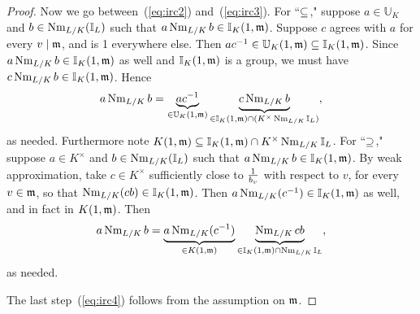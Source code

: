 \begin{proof}
Now we go between~(\ref{eq:irc2}) and~(\ref{eq:irc3}). For ``$\subseteq$," suppose $a\in \mathbb U_K$ and $b\in \operatorname{Nm}_{L/K}(\mathbb{I}_L)$ such that $a\operatorname{Nm}_{L/K}b\in\mathbb{I}_K(1,{\mathfrak{m}})$. Suppose $c$ agrees with $a$ for every $v\mid\mathfrak{m}$, and is 1 everywhere else. Then $ac^{-1}\in \mathbb U_{K}(1,\mathfrak{m})\subseteq \mathbb{I}_K(1,{\mathfrak{m}})$. Since $a\operatorname{Nm}_{L/K}b\in\mathbb{I}_K(1,{\mathfrak{m}})$ as well and $\mathbb{I}_K(1,{\mathfrak{m}})$ is a group, we must have $c\operatorname{Nm}_{L/K}b\in\mathbb{I}_K(1,{\mathfrak{m}})$.
Hence
\[
a\operatorname{Nm}_{L/K}b=\underbrace{ac^{-1}}_{\in \mathbb U_K(1,\mathfrak{m})} 
\underbrace{c\operatorname{Nm}_{L/K}b}_{\in \mathbb I_{K}(1,\mathfrak{m})\cap (K^{\times}\operatorname{Nm}_{L/K}\mathbb{I}_L)},
\]
as needed. Furthermore note $K(1,\mathfrak{m})\subseteq \mathbb{I}_K(1,\mathfrak{m})\cap K^{\times}\operatorname{Nm}_{L/K}\mathbb{I}_L$. For ``$\supseteq$," suppose $a\in K^{\times}$ and $b\in \operatorname{Nm}_{L/K}(\mathbb{I}_L)$ such that $a\operatorname{Nm}_{L/K}b\in\mathbb{I}_K(1,{\mathfrak{m}})$. %
By weak approximation, take $c\in K^{\times}$ sufficiently close to $\frac{1}{b_v}$ with respect to $v$, for every $v\in \mathfrak{m}$, so that $\operatorname{Nm}_{L/K}(cb)\in \mathbb{I}_K(1,{\mathfrak{m}})$. Then $a\operatorname{Nm}_{L/K}(c^{-1})\in \mathbb{I}_K(1,{\mathfrak{m}})$ as well, and in fact in $K(1,\mathfrak{m})$. %
Then
\[
a\operatorname{Nm}_{L/K}b=\underbrace{a\operatorname{Nm}_{L/K}(c^{-1})}_{\in K(1,{\mathfrak{m}})}
\underbrace{\operatorname{Nm}_{L/K}cb}_{\in \mathbb{I}_K(1,{\mathfrak{m}})\cap \operatorname{Nm}_{L/K}\mathbb{I}_L},
\]
as needed.


The last step~(\ref{eq:irc4}) follows from the assumption on $\mathfrak{m}$.
\end{proof}

